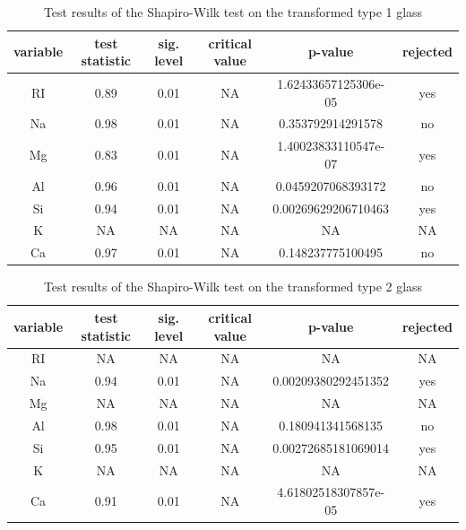 \documentclass[a4paper, 12pt, titlepage, headsepline, listof = totoc, bibliography = totoc, numbers = noenddot]{scrartcl}
\begin{document}
\begin{appendix}
\begin{table}[h!]
\centering
\begin{tabular}{|cccccc|} \hline variable & test statistic & sig. level & critical value & p-value & rejected\\ \hline RI & 0.89 & 0.01 & NA & 1.62433657125306e-05 & yes\\ 
Na & 0.98 & 0.01 & NA & 0.353792914291578 & no\\ 
Mg & 0.83 & 0.01 & NA & 1.40023833110547e-07 & yes\\ 
Al & 0.96 & 0.01 & NA & 0.0459207068393172 & no\\ 
Si & 0.94 & 0.01 & NA & 0.00269629206710463 & yes\\ 
K & NA & NA & NA & NA & NA\\ 
Ca & 0.97 & 0.01 & NA & 0.148237775100495 & no\\ \hline \end{tabular}\caption{Test results of the Shapiro-Wilk test on the transformed type 1 glass}
\label{tab:testrestype1SWtrans}
\end{table}

\begin{table}[h!]
\centering
\begin{tabular}{|cccccc|} \hline variable & test statistic & sig. level & critical value & p-value & rejected\\ \hline RI & NA & NA & NA & NA & NA\\ 
Na & 0.94 & 0.01 & NA & 0.00209380292451352 & yes\\ 
Mg & NA & NA & NA & NA & NA\\ 
Al & 0.98 & 0.01 & NA & 0.180941341568135 & no\\ 
Si & 0.95 & 0.01 & NA & 0.00272685181069014 & yes\\ 
K & NA & NA & NA & NA & NA\\ 
Ca & 0.91 & 0.01 & NA & 4.61802518307857e-05 & yes\\ \hline \end{tabular}\caption{Test results of the Shapiro-Wilk test on the transformed type 2 glass}
\label{tab:testrestype2SWtrans}
\end{table}


\end{appendix}
\end{document}
